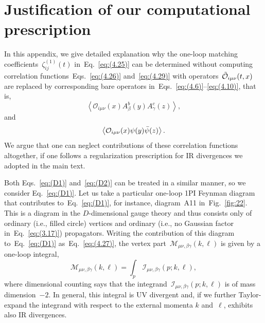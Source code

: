 \section{Justification of our computational prescription}
\label{sec:D}
In this appendix, we give detailed explanation why the one-loop matching
coefficients~$\zeta^{(1)}_{ij}(t)$ in~Eq.~\eqref{eq:(4.25)} can be determined
without computing correlation functions~Eqs.~\eqref{eq:(4.26)}
and~\eqref{eq:(4.29)} with operators~$\Tilde{\mathcal{O}}_{i\mu\nu}(t,x)$ are
replaced by corresponding bare operators
in~Eqs.~\eqref{eq:(4.6)}--\eqref{eq:(4.10)}, that is,
\begin{equation}
   \left\langle\mathcal{O}_{i\mu\nu}(x)
   A_\beta^b(y)A_\gamma^c(z)\right\rangle,
\label{eq:(D1)}
\end{equation}
and
\begin{equation}
   \left\langle\mathcal{O}_{i\mu\nu}(x)
   \psi(y)\Bar{\psi}(z)\right\rangle.
\label{eq:(D2)}
\end{equation}
We argue that one can neglect contributions of these correlation functions
altogether, if one follows a regularization prescription for IR divergences we
adopted in the main text.

Both Eqs.~\eqref{eq:(D1)} and~\eqref{eq:(D2)} can be treated in a similar
manner, so we consider Eq.~\eqref{eq:(D1)}. Let us take a particular one-loop
1PI Feynman diagram that contributes to~Eq.~\eqref{eq:(D1)}, for instance,
diagram~A11 in~Fig.~\ref{fig:22}. This is a diagram in the $D$-dimensional
gauge theory and thus consists only of ordinary (i.e., filled circle) vertices
and ordinary (i.e., no Gaussian factor in~Eq.~\eqref{eq:(3.17)}) propagators.
Writing the contribution of this diagram to~Eq.~\eqref{eq:(D1)}
as~Eq.~\eqref{eq:(4.27)}, the vertex
part~$\mathcal{M}_{\mu\nu,\beta\gamma}(k,\ell)$ is given by a one-loop integral,
\begin{equation}
   \mathcal{M}_{\mu\nu,\beta\gamma}(k,\ell)=\int_p\,
   \mathcal{I}_{\mu\nu,\beta\gamma}(p;k,\ell),
\label{eq:(D3)}
\end{equation}
where dimensional counting says that the
integrand~$\mathcal{I}_{\mu\nu,\beta\gamma}(p;k,\ell)$ is of mass dimension~$-2$.
In general, this integral is UV divergent and, if we further Taylor-expand the
integrand with respect to the external momenta $k$ and~$\ell$, exhibits also IR
divergences.

